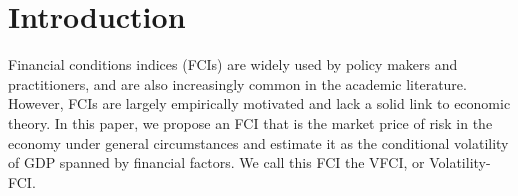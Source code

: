 \documentclass[12pt]{article}
\begin{document}
\section{Introduction}

Financial conditions indices (FCIs) are widely used by policy makers and practitioners, and are also increasingly common in the academic literature. However, FCIs are largely empirically motivated and lack a solid link to economic theory. In this paper, we propose an FCI that is the market price of risk in the economy under general circumstances and estimate it as the conditional volatility of GDP spanned by financial factors. We call this FCI the VFCI, or Volatility-FCI. 
\end{document}
